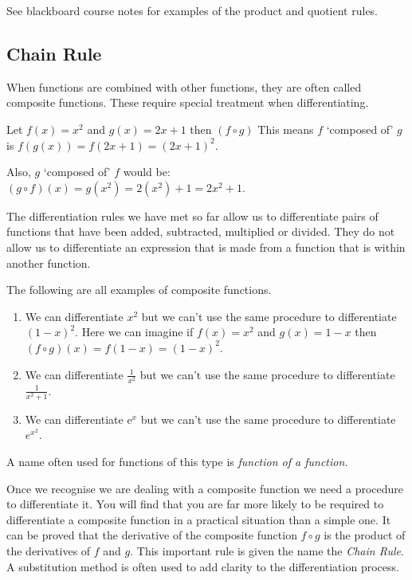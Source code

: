 \example See blackboard course notes for examples of the product and quotient rules.
\subsection*{Chain Rule}
When functions are combined with other functions, they are often called composite functions. These require special treatment when differentiating.

Let $f (x) =x^{2}$ and $g (x) =2 x +1$ then $\left (f \circ g\right )$ This means $f$ `composed of' $g$ is $f \left (g \left (x\right )\right ) =f (2 x +1) =\left (2 x +1\right )^{2}$. 

Also, $g$ `composed of' $f$ would be: $\left (g \circ f\right ) (x) =g \left (x^{2}\right ) =2 \left (x^{2}\right ) +1 =2 x^{2} +1$. 

The differentiation rules we have met so far allow us to differentiate pairs of functions that have been added, subtracted, multiplied or divided. They do not allow us to differentiate an expression that is made from a function that is within another function.

The following are all examples of composite functions. 
\begin{enumerate}
\item We can differentiate $x^{2}$ but we can't use the same procedure to differentiate $\left (1 -x\right )^{2}$. Here we can imagine if  $f (x) =x^{2}$ and $g (x) =1 -x$ then $\left (f \circ g\right ) (x) =f (1 -x) =\left (1 -x\right )^{2}$.

\item We can differentiate $\frac{1}{x^{2}}$ but we can't use the same procedure to differentiate $\frac{1}{x^{2} +1}$. 

\item We can differentiate e$^{x}$ but we can't use the same procedure to differentiate $e^{x^{2}}$. 
\end{enumerate}

A name often used for functions of this type is \emph{function of a function.} 

Once we recognise we are dealing with a composite function we need a procedure to differentiate it. You will find that you are far more likely to be required to differentiate a composite function in a practical situation than a simple one. It can be proved that the derivative of the composite function $f \circ g$ is the product of the derivatives of $f$ and $g$. This important rule is given the name the \emph{Chain Rule}. A substitution method is often used to add clarity to the differentiation process. 

